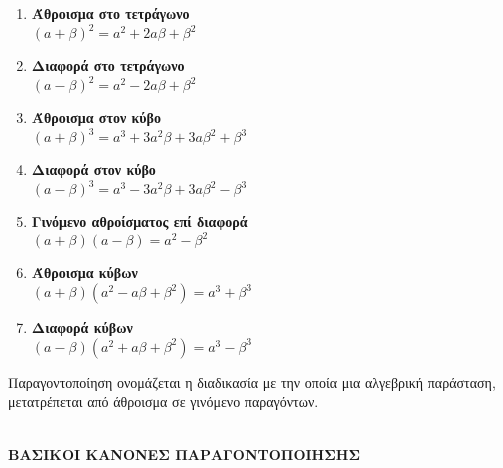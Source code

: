 \documentclass[twoside,nofonts,internet,shmeiwseis]{thewria}
\begin{document}
\begin{multicols}{2}
\begin{enumerate}[itemsep=0mm,label=\bf\arabic*.]
\item \parbox[t]{7cm}{\textbf{Άθροισμα στο τετράγωνο}\\$ (a+\beta)^2=a^2+2a\beta+\beta^2 $}
\item \parbox[t]{7cm}{\textbf{Διαφορά στο τετράγωνο}\\$ (a-\beta)^2=a^2-2a\beta+\beta^2 $}
\item \parbox[t]{7cm}{\textbf{Άθροισμα στον κύβο}\\$ (a+\beta)^3=a^3+3a^2\beta+3a\beta^2+\beta^3 $}
\item \parbox[t]{7cm}{\textbf{Διαφορά στον κύβο}\\$ (a-\beta)^3=a^3-3a^2\beta+3a\beta^2-\beta^3 $}
\item \parbox[t]{7cm}{\textbf{Γινόμενο αθροίσματος επί διαφορά}\\$ (a+\beta)(a-\beta)=a^2-\beta^2 $}
\item \parbox[t]{7cm}{\textbf{Άθροισμα κύβων}\\$ (a+\beta)\left(a^2-a\beta+\beta^2 \right)=a^3+\beta^3 $}
\item \parbox[t]{7cm}{\textbf{Διαφορά κύβων}\\$ (a-\beta)\left(a^2+a\beta+\beta^2 \right)=a^3-\beta^3 $}
\end{enumerate}
\end{multicols}
Παραγοντοποίηση ονομάζεται η διαδικασία με την οποία μια αλγεβρική παράσταση, μετατρέπεται από άθροισμα σε γινόμενο παραγόντων.\\\\
\begin{center}
\textbf{ΒΑΣΙΚΟΙ ΚΑΝΟΝΕΣ ΠΑΡΑΓΟΝΤΟΠΟΙΗΣΗΣ}
\end{center}
\end{document}
